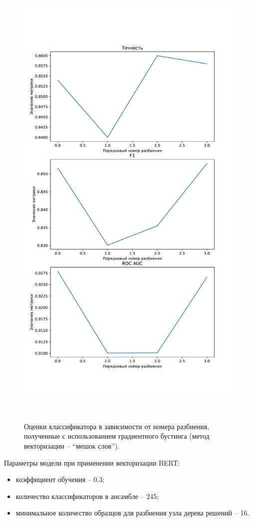 \begin{figure}[H]
	\centering
	\includegraphics[height=23cm]{inc/plots/gradientMetricsBag.pdf}
	\caption{ Оценки классификатора в зависимости от номера разбиения, полученные с использованием градиентного бустинга (метод векторизации --  ``мешок слов''). }
	\label{img:gradientMetricsBag}
\end{figure}

Параметры модели при применении векторизации BERT:
\begin{itemize}
	\item коэффициент обучения -- 0.3;
	\item количество классификаторов в ансамбле -- 245;
	\item минимальное количество образцов для разбиения узла дерева решений -- 16.
\end{itemize}

